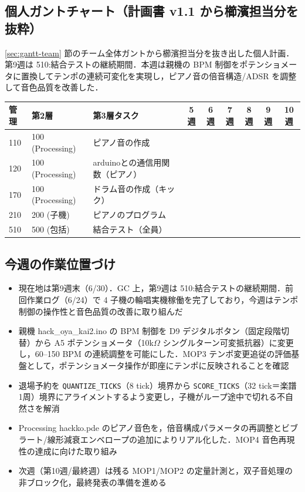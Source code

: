 \documentclass[a4paper,11pt]{ltjsarticle}
\providecommand{\％}{\%}
\begin{document}
\endgroup

\subsection{個人ガントチャート（計画書 v1.1 から櫛濱担当分を抜粋）}\label{sec:gantt-personal}

\ref{sec:gantt-team} 節のチーム全体ガントから櫛濱担当分を抜き出した個人計画．第9週は 510:結合テストの継続期間．本週は親機の BPM 制御をポテンショメータに置換してテンポの連続可変化を実現し，ピアノ音の倍音構造/ADSR を調整して音色品質を改善した．

\begingroup
\setlength{\tabcolsep}{3pt}
\begin{longtable}{|p{0.9cm}|p{2.0cm}|p{5.2cm}|c|c|c|c|c|c|}
\hline
\rowcolor[gray]{0.9}
管理 & 第2層 & 第3層タスク & 5週 & 6週 & 7週 & 8週 & 9週 & 10週 \\
\hline
110 & 100 (Processing) & ピアノ音の作成 & \cellcolor{ganttCell} & & \cellcolor{ganttCell} & & & \\
\hline
120 & 100 (Processing) & arduinoとの通信用関数（ピアノ） & \cellcolor{ganttCell} & & & & & \\
\hline
170 & 100 (Processing) & ドラム音の作成（キック） & & \cellcolor{ganttCell} & & & & \\
\hline
210 & 200 (子機) & ピアノのプログラム & \cellcolor{ganttCell} & & & & & \\
\hline
510 & 500 (包括) & 結合テスト（全員） & & & & \cellcolor{ganttCell} & \cellcolor{ganttCell} & \cellcolor{ganttCell} \\
\hline
\end{longtable}
\endgroup

\subsection{今週の作業位置づけ}\label{sec:gantt-position}

\begin{itemize}
    \item 現在地は第9週末（6/30）．GC 上，第9週は 510:結合テストの継続期間．前回作業ログ（6/24）で 4 子機の輪唱実機稼働を完了しており，今週はテンポ制御の操作性と音色品質の改善に取り組んだ
    \item 親機 hack\_oya\_kai2.ino の BPM 制御を D9 デジタルボタン（固定段階切替）から A5 ポテンショメータ（10k$\Omega$ シングルターン可変抵抗器）に変更し，60--150 BPM の連続調整を可能にした．MOP3 テンポ変更追従の評価基盤として，ポテンショメータ操作が即座にテンポに反映されることを確認
    \item 退場予約を \texttt{QUANTIZE\_TICKS}（8 tick）境界から \texttt{SCORE\_TICKS}（32 tick＝楽譜1周）境界にアライメントするよう変更し，子機がループ途中で切れる不自然さを解消
    \item Processing hackko.pde のピアノ音色を，倍音構成パラメータの再調整とビブラート/線形減衰エンベロープの追加によりリアル化した．MOP4 音色再現性の達成に向けた取り組み
    \item 次週（第10週/最終週）は残る MOP1/MOP2 の定量計測と，双子音処理の非ブロック化，最終発表の準備を進める
\end{itemize}
\end{document}
